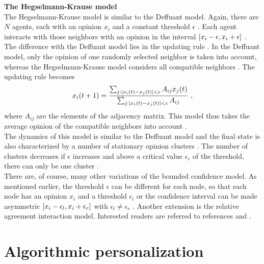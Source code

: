 \documentclass[11 pt , letterpaper , twoside , openright]{book}
\begin{document}
\newline
\textbf{The Hegselmann-Krause model}\\
\newline
The Hegselmann-Krause model is similar to the Deffuant model. Again, there are $N$ agents, each with an opinion $x_i$ and a constant threshold $\epsilon$ \cite{Castellano2009}. Each agent interacts with those neighbors with an opinion in the interval $\interval{x_i-\epsilon}{x_i+\epsilon}$ \cite{Castellano2009}. The difference with the Deffuant model lies in the updating rule \cite{Castellano2009}. In the Deffuant model, only the opinion of one randomly selected neighbor is taken into account, whereas the Hegselmann-Krause model considers all compatible neighbors \cite{Castellano2009}. The updating rule becomes \cite{Castellano2009}
\begin{equation}
	x_i(t+1) = \frac{\sum_{j:\abs{x_i(t) - x_j(t)}<\epsilon}A_{ij}x_j(t)}{\sum_{j:\abs{x_i(t) - x_j(t)}<\epsilon}A_{ij}} \ ,
\end{equation}
where $A_{ij}$ are the elements of the adjacency matrix. This model thus takes the average opinion of the compatible neighbors into account \cite{Castellano2009}.\\
\newline
The dynamics of this model is similar to the Deffuant model and the final state is also characterized by a number of stationary opinion clusters \cite{Castellano2009}. The number of clusters decreases if $\epsilon$ increases and above a critical value $\epsilon_c$ of the threshold, there can only be one cluster \cite{Castellano2009}.\\
\newline
There are, of course, many other variations of the bounded confidence model. As mentioned earlier, the threshold $\epsilon$ can be different for each node, so that each node has an opinion $x_i$ and a threshold $\epsilon_i$ or the confidence interval can be made asymmetric $\interval{x_i - \epsilon_l}{x_i + \epsilon_r}$ with $\epsilon_l \neq
\epsilon_r$ \cite{Krause2002}. Another extension is the relative agreement interaction model. Interested readers are referred to references \cite{Deffuant2006} and \cite{Deffuant2002}.
\newpage
\section{Algorithmic personalization}\label{filter}
\end{document}
